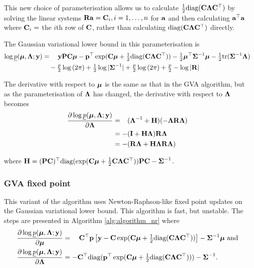 \documentclass{amsart}[12pt]
\begin{document}
	\noindent This new choice of parameterisation allows us to calculate $\tfrac{1}{2} \text{diag}({\bf C} {\boldsymbol \Lambda}
	{\bf C}^\top)$ by solving the linear systems ${\bf R} {\bf a} = {\bf C}_{i}, i=1, \ldots, n$ for   ${\bf a}$ and then calculating
	${\bf a}^\top{\bf a}$ where ${\bf C}_{i} = $ the $i$th row of ${\bf C}$, rather than calculating $\text{diag}({\bf C} {\boldsymbol \Lambda}
	{\bf C}^\top)$ directly.
		
	\noindent The Gaussian variational lower bound in this parameterisation is
	\begin{align*}
		\log \underline{p}({\boldsymbol \mu}, {\boldsymbol \Lambda}; {\bf y}) & = \quad {\bf y}{\bf P}{\bf C} {\boldsymbol\mu} - {\bf p}^\top \exp({\bf C} {\boldsymbol \mu} + \tfrac{1}{2} \text{diag}({\bf C} {\boldsymbol \Lambda} {\bf C}^\top)) - \tfrac{1}{2} {\boldsymbol \mu}^\top {\boldsymbol\Sigma}^{-1} {\boldsymbol \mu} - \tfrac{1}{2} \text{tr}{({\boldsymbol\Sigma}^{-1} {\boldsymbol\Lambda})} \\
		                                        & \quad- \tfrac{p}{2} \log{(2 \pi)} + \tfrac{1}{2} \log{|{\boldsymbol\Sigma}^{-1}|} + \tfrac{p}{2} \log{(2 \pi)} + \tfrac{p}{2} - \log{|{\bf R}|}                                             
	\end{align*}
		
	\noindent The derivative with respect to ${\boldsymbol \mu}$ is the same as that in the GVA algorithm, but as the parameterisation of
	${\boldsymbol \Lambda}$ has changed, the  derivative with respect to ${\boldsymbol \Lambda}$ becomes
	\begin{align*}
		\frac{\partial \log \underline{p}({\boldsymbol \mu}, {\boldsymbol \Lambda}; {\bf y})}{\partial {\boldsymbol\Lambda}}
		  & = \hphantom{-}({\boldsymbol \Lambda}^{-1} + {\bf H})(-{\boldsymbol \Lambda} {\bf R} {\boldsymbol \Lambda}) \\
		  & = -({\bf I} + {\bf H}{\boldsymbol \Lambda}){\bf R}{\boldsymbol \Lambda}                           \\
		  & = - ({\bf R}{\boldsymbol \Lambda} + {\bf H}{\boldsymbol \Lambda}{\bf R}{\boldsymbol \Lambda})                  
	\end{align*} 
		
	\noindent where ${\bf H} = ({\bf P} {\bf C})^\top \text{diag}(\exp({\bf C} {\boldsymbol \mu} + \tfrac{1}{2} {\bf C} {\boldsymbol \Lambda} {\bf C}^\top)) {\bf P} {\bf C} - {\boldsymbol \Sigma}^{-1}$.
		
	\subsubsection{GVA fixed point}
		
		
	This variant of the algorithm uses Newton-Raphson-like fixed point updates on the Gaussian variational lower
	bound. This algorithm is fast, but unstable. The steps are presented in Algorithm \ref{alg:algorithm_nr} where
	\begin{align*}
		\frac{\partial \log \underline{p}({\boldsymbol \mu}, {\boldsymbol \Lambda}; {\bf y})}{\partial {\boldsymbol\mu}}     & = \quad {\bf C}^\top{\bf p} \left [{\bf y} - {\bf C}\exp({\bf C} {\boldsymbol \mu} + \tfrac{1}{2} \text{diag}({\bf C} {\boldsymbol \Lambda} {\bf C}^\top)) \right ] - {\boldsymbol \Sigma}^{-1} {\boldsymbol \mu} \text{ and} \\
		\frac{\partial \log \underline{p}({\boldsymbol \mu}, {\boldsymbol \Lambda}; {\bf y})}{\partial {\boldsymbol\Lambda}} & = -{\bf C}^\top \text{diag}({\bf p}^\top \exp({\bf C} {\boldsymbol \mu} +\tfrac{1}{2} \text{diag}({\bf C} {\boldsymbol \Lambda} {\bf C}^\top))) - {\boldsymbol \Sigma}^{-1}.                             
	\end{align*}
		
\end{document}
